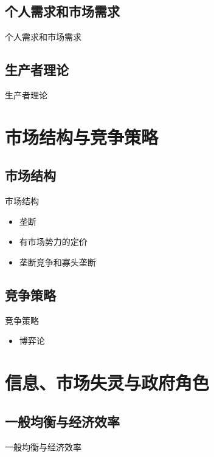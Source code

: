 \documentclass[UTF8]{ctexbeamer}
\begin{document}
\subsection{个人需求和市场需求}
\begin{frame}{个人需求和市场需求}
\end{frame}


\subsection{生产者理论}
\begin{frame}{生产者理论}
\end{frame}

\section{市场结构与竞争策略}

\subsection{市场结构}
\begin{frame}{市场结构}
\begin{itemize}
\item 垄断
\item 有市场势力的定价
\item 垄断竞争和寡头垄断
\end{itemize}
\end{frame}


\subsection{竞争策略}
\begin{frame}{竞争策略}
\begin{itemize}
\item 博弈论
\end{itemize}
\end{frame}

\section{ 信息、市场失灵与政府角色}

\subsection{一般均衡与经济效率}
\begin{frame}{一般均衡与经济效率}
\end{frame}
\end{document}
